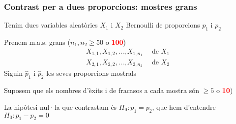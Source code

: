 \documentclass[12pt,t]{beamer}
\newcommand{\red}[1]{\textcolor{red}{#1}}
\renewcommand{\emph}[1]{{\color{red}#1}}
\renewcommand{\geq}{\geqslant}
\theoremstyle{plain}
\theoremstyle{definition}
\begin{document}
\begin{frame}
\frametitle{Contrast per a dues proporcions: mostres grans}

Tenim dues variables aleatòries $X_1$ i $X_2$ Bernoulli de proporcions  $p_1$ i $p_2$
\medskip

Prenem m.a.s. \emph{grans} ($n_1,n_2\geq 50$ o \red{\bf 100})
$$
\begin{array}{l}
X_{1,1}, X_{1,2},\ldots, X_{1,n_1}\quad\mbox{ de }X_1\\
X_{2,1}, X_{2,2},\ldots, X_{2,n_2}\quad\mbox{ de }X_2
\end{array}
$$
Siguin $\widehat{p}_1$ i $\widehat{p}_2$  les seves proporcions mostrals
\medskip

Suposem que els nombres d'èxits i de fracasos a cada mostra són $\geq 5$ o \red{\bf 10})
\medskip


La hipòtesi nul·la que contrastam és $H_0: p_1=p_2$, que hem d'entendre $H_0: p_1-p_2=0$
\end{frame}
\end{document}
